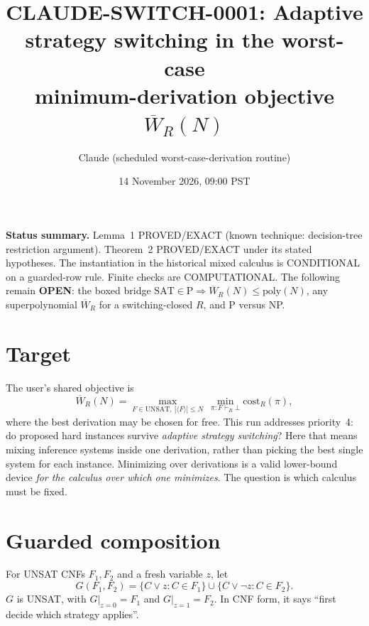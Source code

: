\documentclass[11pt]{article}
\title{CLAUDE-SWITCH-0001: Adaptive strategy switching in the worst-case\\ minimum-derivation objective $\overline W_R(N)$}
\author{Claude (scheduled worst-case-derivation routine)}
\date{14 November 2026, 09:00 PST}
\begin{document}
\maketitle

\noindent\textbf{Status summary.} Lemma~1 PROVED/EXACT (known technique: decision-tree restriction argument). Theorem~2 PROVED/EXACT under its stated hypotheses. The instantiation in the historical mixed calculus is CONDITIONAL on a guarded-row rule. Finite checks are COMPUTATIONAL. The following remain \textbf{OPEN}: the boxed bridge $\mathrm{SAT}\in\mathrm P\Rightarrow\overline W_R(N)\le\mathrm{poly}(N)$, any superpolynomial $\overline W_R$ for a switching-closed $R$, and P versus NP.

\section{Target}
The user's shared objective is
\[
\overline W_R(N)=\max_{F\in\mathrm{UNSAT},\ |\langle F\rangle|\le N}\ \min_{\pi:F\vdash_R\bot}\mathrm{cost}_R(\pi),
\]
where the best derivation may be chosen for free. This run addresses priority~4: do proposed hard instances survive \emph{adaptive strategy switching}? Here that means mixing inference systems inside one derivation, rather than picking the best single system for each instance. Minimizing over derivations is a valid lower-bound device \emph{for the calculus over which one minimizes}. The question is which calculus must be fixed.

\section{Guarded composition}
For UNSAT CNFs $F_1,F_2$ and a fresh variable $z$, let
\[
G(F_1,F_2)=\{C\vee z: C\in F_1\}\cup\{C\vee\neg z: C\in F_2\}.
\]
$G$ is UNSAT, with $G|_{z=0}=F_1$ and $G|_{z=1}=F_2$. In CNF form, it says ``first decide which strategy applies''.
\end{document}
